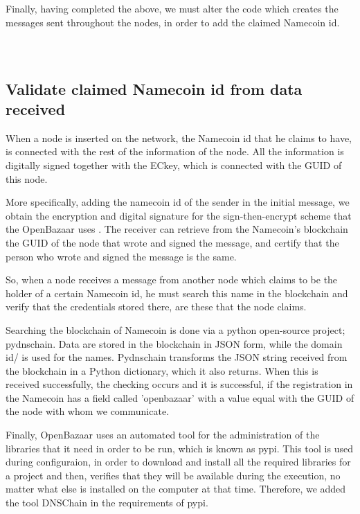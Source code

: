\documentclass[journal]{IEEEtran}
\newcommand{\code}[2]{
    \inputminted[fontsize=\scriptsize, frame=single, linenos=false]{#1}{#2}
}
\begin{document}
Finally, having completed the above, we must alter the code which creates the messages sent throughout the nodes, in order to add the claimed Namecoin id. 

\code{python}{codes/market.py}
\code{python}{codes/connection1.py}
\code{python}{codes/connection2.py}

\subsection{Validate claimed Namecoin id from data received}

When a node is inserted on the network, the Namecoin id that he claims to have, is connected with the rest of the information of the node. All the information is digitally signed together with the ECkey, which is connected with the GUID of this node.

More specifically, adding the namecoin id of the sender in the initial message, we obtain the encryption and digital signature for the sign-then-encrypt scheme that the OpenBazaar uses \cite{DonDavis}. The receiver can retrieve from the Namecoin's blockchain the GUID of the node that wrote and signed the message, and certify that the person who wrote and signed the message is the same. 

So, when a node receives a message from another node which claims to be the holder of a certain Namecoin id, he must search this name in the blockchain and verify that the credentials stored there, are these that the node claims.

Searching the blockchain of Namecoin is done via a python open-source project; pydnschain. Data are stored in the blockchain in JSON form, while the domain id/ is used for the names. Pydnschain transforms the JSON string received from the blockchain in a Python dictionary, which it also returns.  When this is received successfully, the checking occurs and it is successful, if the registration in the Namecoin has a field called 'openbazaar' with a value equal with the GUID of the node with whom we communicate. 

Finally, OpenBazaar uses an automated tool for the administration of the libraries that it need in order to be run, which is known as pypi. This tool is used during configuraion, in order to download and install all the required libraries for a project and then, verifies that they will be available during the execution, no matter what else is installed on the computer at that time. Therefore, we added the tool DNSChain in the requirements of pypi.
\end{document}
